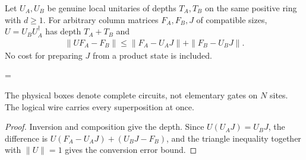 \begin{lemma}
    \label{thm:ldp_common_encoder_conversion}
    \leanok
    Let $U_A,U_B$ be genuine local unitaries of depths $T_A,T_B$ on the
    same positive ring with $d\ge1$. For arbitrary column matrices
    $F_A,F_B,J$ of compatible sizes, $U=U_BU_A^\dagger$ has depth
    $T_A+T_B$ and
    \begin{align}
        \|UF_A-F_B\|
        \le\|F_A-U_AJ\|+\|F_B-U_BJ\|.
        \label{eq:ldp_common_encoder_conversion}
    \end{align}
    No cost for preparing $J$ from a product state is included.

    \begin{center}
        \tenkzkernel
        \begin{tenkzequation}
            \begin{tenkz}[rows={wire,wire}, cols=1, bonds=none]
            \end{tenkz}
            =
            \begin{tenkz}[rows={wire}, cols=1, bonds=none]
            \end{tenkz}
        \end{tenkzequation}
    \end{center}
    The physical boxes denote complete circuits, not elementary gates
    on $N$ sites. The logical wire carries every superposition at once.
\end{lemma}
\begin{proof}\leanok
    Inversion and composition give the depth. Since
    $U(U_AJ)=U_BJ$, the difference is
    $U(F_A-U_AJ)+(U_BJ-F_B)$, and the triangle inequality together with
    $\|U\|=1$ gives the conversion error bound.
\end{proof}

